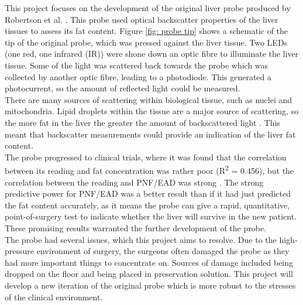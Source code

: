 This project focuses on the development of the original liver probe produced by Robertson et al. \cite{Robertson}. This probe used optical backscatter properties of the liver tissues to assess its fat content. Figure \ref{fig: probe tip} shows a schematic of the tip of the original probe, which was pressed against the liver tissue. Two LEDs (one red, one infrared (IR)) were shone down an optic fibre to illuminate the liver tissue. Some of the light was scattered back towards the probe which was collected by another optic fibre, leading to a photodiode. This generated a photocurrent, so the amount of reflected light could be measured. \\

There are many sources of scattering within biological tissue, such as nuclei and mitochondria. Lipid droplets within the tissue are a major source of scattering, so the more fat in the liver the greater the amount of backscattered light \cite{McLaughlin}. This meant that backscatter measurements could provide an indication of the liver fat content.\\

The probe progressed to clinical trials, where it was found that the correlation between its reading and fat concentration was rather poor (R\textsuperscript{2} = 0.456), but the correlation between the reading and PNF/EAD was strong \cite{Robertson}. The strong predictive power for PNF/EAD was a better result than if it had just predicted the fat content accurately, as it means the probe can give a rapid, quantitative, point-of-surgery test to indicate whether the liver will survive in the new patient. These promising results warranted the further development of the probe.\\

The probe had several issues, which this project aims to resolve. Due to the high-pressure environment of surgery, the surgeons often damaged the probe as they had more important things to concentrate on. Sources of damage included being dropped on the floor and being placed in preservation solution. This project will develop a new iteration of the original probe which is more robust to the stresses of the clinical environment.\\




